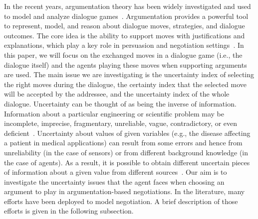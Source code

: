In the recent years, argumentation theory has been widely investigated and used to model and analyze dialogue games~\cite{BentaharAIR,BentaharKBS10,Reed06,Mahalakshmi09}.
Argumentation provides a powerful tool to represent, model, and reason about dialogue moves, strategies, and dialogue outcomes. The core idea is the ability
to support moves with justifications and explanations, which play a key role in persuasion and negotiation settings~\cite{GarciaCRS13}. In this paper, we
will focus on the exchanged moves in a dialogue game (i.e., the dialogue itself) and the agents playing these moves when supporting arguments are used.
The main issue we are investigating is the uncertainty index of selecting the right moves during the dialogue, the certainty index that the selected move
will be accepted by the addressee, and the uncertainty index of the whole dialogue. Uncertainty can be thought of as being the inverse of information. Information
about a particular engineering or scientific problem may be incomplete, imprecise, fragmentary, unreliable, vague, contradictory, or even deficient~\cite{RossJA13}.
Uncertainty about values of given variables (e.g., the disease affecting a patient in medical applications) can result from some errors and hence from unreliability
(in the case of sensors) or from different background knowledge (in the case of agents). As a result, it is possible to obtain different uncertain pieces of
information about a given value from different sources~\cite{Jenhani07}. Our aim is to investigate the uncertainty issues that the agent faces when choosing an
argument to play in argumentation-based negotiations. In the literature, many efforts have been deployed to model negotiation. A brief description of those efforts
is given in the following subsection.


